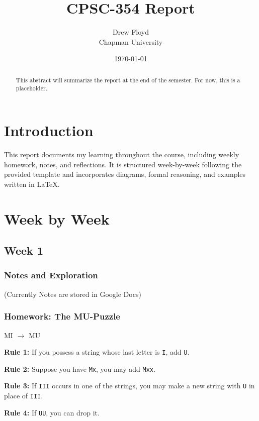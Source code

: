 \documentclass{article}
\title{CPSC-354 Report}
\author{Drew Floyd \\ Chapman University}
\date{\today}
\theoremstyle{theorem}
\theoremstyle{definition}
\theoremstyle{remark}
\begin{document}
\maketitle

\begin{abstract}
This abstract will summarize the report at the end of the semester. For now, this is a placeholder.
\end{abstract}

\tableofcontents

\section{Introduction}\label{intro}
This report documents my learning throughout the course, including weekly homework, notes, and reflections. It is structured week-by-week following the provided template and incorporates diagrams, formal reasoning, and examples written in \LaTeX.

\section{Week by Week}\label{homework}

\subsection{Week 1}

\subsubsection{Notes and Exploration}
(Currently Notes are stored in Google Docs)

\subsubsection{Homework: The MU-Puzzle}
MI $\rightarrow$ MU

\textbf{Rule 1:} If you possess a string whose last letter is \texttt{I}, add \texttt{U}.

\textbf{Rule 2:} Suppose you have \texttt{Mx}, you may add \texttt{Mxx}.

\textbf{Rule 3:} If \texttt{III} occurs in one of the strings, you may make a new string with \texttt{U} in place of \texttt{III}.

\textbf{Rule 4:} If \texttt{UU}, you can drop it.

\vspace{1em}
\end{document}
